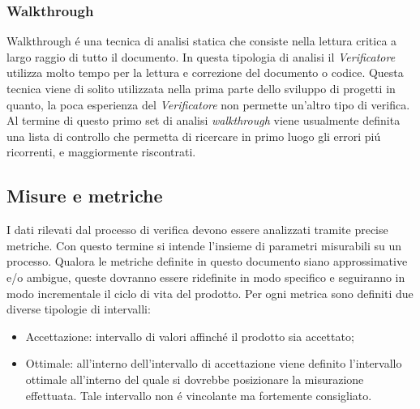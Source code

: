 \subsubsection{Walkthrough}
Walkthrough \'e una tecnica di analisi statica che consiste nella lettura critica a largo raggio di tutto il documento. In questa tipologia di analisi il \textit{Verificatore} utilizza molto tempo per la lettura e correzione del documento o codice. Questa tecnica viene di solito utilizzata nella prima parte dello sviluppo di progetti in quanto, la poca esperienza del \textit{Verificatore} non permette un'altro tipo di verifica. Al termine di questo primo set di analisi \textit{walkthrough} viene usualmente definita una lista di controllo che permetta di ricercare in primo luogo gli errori pi\'u ricorrenti, e maggiormente riscontrati.
\subsection{Misure e metriche}
I dati rilevati dal processo di verifica devono essere analizzati tramite precise metriche.
Con questo termine si intende l'insieme di parametri misurabili su un processo. Qualora le metriche definite in questo documento siano approssimative e/o ambigue, queste dovranno essere ridefinite in modo specifico e seguiranno in modo incrementale il ciclo di vita del prodotto.
Per ogni metrica sono definiti due diverse tipologie di intervalli:
\begin{itemize}
\item Accettazione: intervallo di valori affinché il prodotto sia accettato;
\item Ottimale: all'interno dell'intervallo di accettazione viene definito l'intervallo ottimale all'interno del quale si dovrebbe posizionare la misurazione effettuata. Tale intervallo non \'e vincolante ma fortemente consigliato.
\end{itemize}
